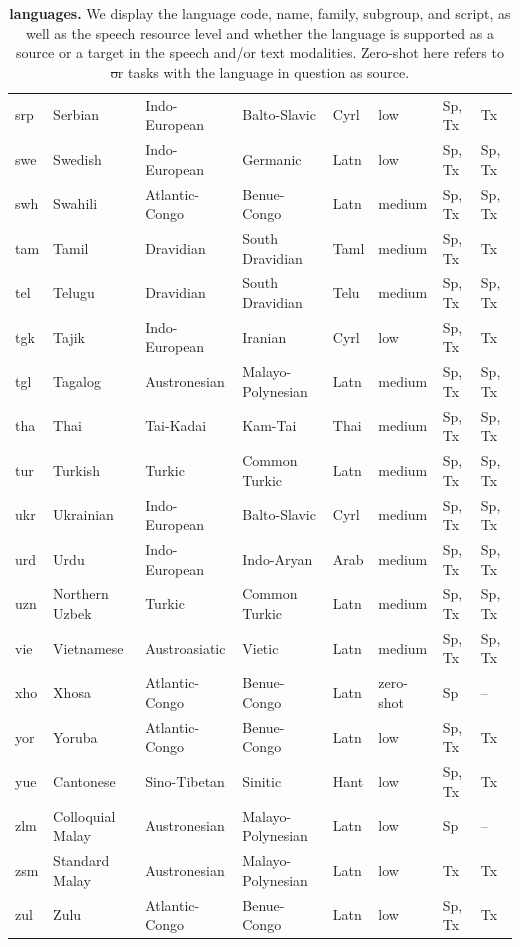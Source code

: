 \begin{table}[!p]
\begin{tabular}{llllllll}
srp & Serbian & Indo-European & Balto-Slavic & Cyrl & low & Sp, Tx & Tx \\
swe & Swedish & Indo-European & Germanic & Latn & low & Sp, Tx & Sp, Tx \\
swh & Swahili & Atlantic-Congo & Benue-Congo & Latn & medium & Sp, Tx & Sp, Tx \\
tam & Tamil & Dravidian & South Dravidian & Taml & medium & Sp, Tx & Tx \\
tel & Telugu & Dravidian & South Dravidian & Telu & medium & Sp, Tx & Sp, Tx \\
tgk & Tajik & Indo-European & Iranian & Cyrl & low & Sp, Tx & Tx \\
tgl & Tagalog & Austronesian & Malayo-Polynesian & Latn & medium & Sp, Tx & Sp, Tx \\
tha & Thai & Tai-Kadai & Kam-Tai & Thai & medium & Sp, Tx & Sp, Tx \\
tur & Turkish & Turkic & Common Turkic & Latn & medium & Sp, Tx & Sp, Tx \\
ukr & Ukrainian & Indo-European & Balto-Slavic & Cyrl & medium & Sp, Tx & Sp, Tx \\
urd & Urdu & Indo-European & Indo-Aryan & Arab & medium & Sp, Tx & Sp, Tx \\
uzn & Northern Uzbek & Turkic & Common Turkic & Latn & medium & Sp, Tx & Sp, Tx \\
vie & Vietnamese & Austroasiatic & Vietic & Latn & medium & Sp, Tx & Sp, Tx \\
xho & Xhosa & Atlantic-Congo & Benue-Congo & Latn & zero-shot & Sp & -- \\
yor & Yoruba & Atlantic-Congo & Benue-Congo & Latn & low & Sp, Tx & Tx \\
yue & Cantonese & Sino-Tibetan & Sinitic & Hant & low & Sp, Tx & Tx \\
zlm & Colloquial Malay & Austronesian & Malayo-Polynesian & Latn & low & Sp & -- \\
zsm & Standard Malay & Austronesian & Malayo-Polynesian & Latn & low & Tx & Tx \\
zul & Zulu & Atlantic-Congo & Benue-Congo & Latn & low & Sp, Tx & Tx \\
\bottomrule
\end{tabular}
\caption{
\label{tab:all_languages}
\textbf{\mfourt languages.} We display the language code, name, family, subgroup, and script, as well as the speech resource level and whether the language is supported as a source or a target in the speech and/or text modalities. Zero-shot here refers to \st or \sst tasks with the language in question as source.
}
\end{table}
